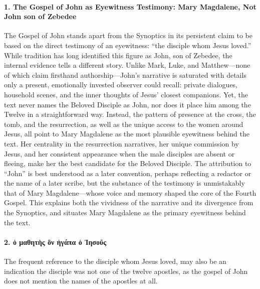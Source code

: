 \paragraph{1.
The Gospel of John as Eyewitness Testimony: Mary Magdalene, Not John son of Zebedee}\label{par:the-gospel-of-john-is-widely-accepted-to-be-one-gospel-that-indicates-it-was-written-by-an-eyewitness.}

The Gospel of John stands apart from the Synoptics in its persistent claim to be based on the direct testimony of an eyewitness: “the disciple whom Jesus loved.” While tradition has long identified this figure as John, son of Zebedee, the internal evidence tells a different story. Unlike Mark, Luke, and Matthew—none of which claim firsthand authorship—John’s narrative is saturated with details only a present, emotionally invested observer could recall: private dialogues, household scenes, and the inner thoughts of Jesus’ closest companions. Yet, the text never names the Beloved Disciple as John, nor does it place him among the Twelve in a straightforward way. Instead, the pattern of presence at the cross, the tomb, and the resurrection, as well as the unique access to the women around Jesus, all point to Mary Magdalene as the most plausible eyewitness behind the text. Her centrality in the resurrection narratives, her unique commission by Jesus, and her consistent appearance when the male disciples are absent or fleeing, make her the best candidate for the Beloved Disciple. The attribution to “John” is best understood as a later convention, perhaps reflecting a redactor or the name of a later scribe, but the substance of the testimony is unmistakably that of Mary Magdalene—whose voice and memory shaped the core of the Fourth Gospel. This explains both the vividness of the narrative and its divergence from the Synoptics, and situates Mary Magdalene as the primary eyewitness behind the text.

\paragraph{2.
ὁ μαθητὴς ὃν ἠγάπα ὁ Ἰησοῦς}\label{par:ux1f41-ux3bcux3b1ux3b8ux3b7ux3c4ux1f74ux3c2-ux1f43ux3bd-ux1f20ux3b3ux3acux3c0ux3b1-ux1f41-ux1f30ux3b7ux3c3ux3bfux1fe6ux3c2}

The frequent reference to the disciple whom Jesus loved, may also be an indication the disciple was not one of the twelve apostles, as the gospel of John does not mention the names of the apostles at all.

